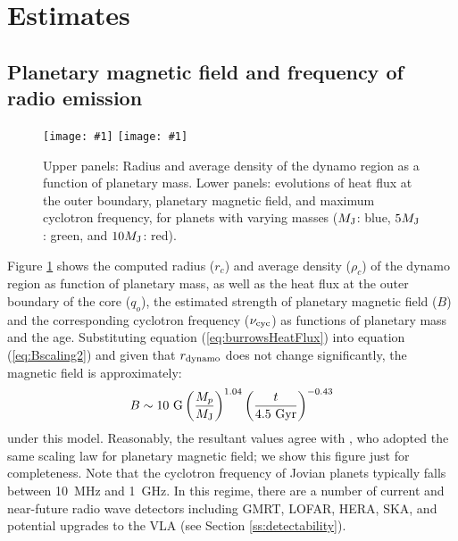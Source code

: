 \documentclass[iop,numberedappendix,apj,twocolappendix,]{emulateapj}
\def\plotoneh#1{\centering \leavevmode
\texttt{[image: \#1]}}
\begin{document}
\section{Estimates}
\label{s:result}

\subsection{Planetary magnetic field and frequency of radio emission}
\label{ss:Bplanet}


\begin{figure}[bhtp]
   \plotoneh{rho_r_dynamo.pdf}
   \plotoneh{qBf_Christensen.pdf}
   \caption{Upper panels: Radius and average density of the dynamo region as a function of planetary mass. Lower panels: evolutions of heat flux at the outer boundary, planetary magnetic field, and maximum cyclotron frequency, for planets with varying masses ($M_{\rm J}$: blue, $5M_{\rm J}$: green, and $10M_{\rm J}$: red). } 
  \label{fig:planetaryB}
\end{figure}

Figure \ref{fig:planetaryB} shows the computed radius ($r_c$) and average density ($\rho_c$) of the dynamo region as function of planetary mass, as well as the heat flux at the outer boundary of the core ($q_o$), the estimated strength of planetary magnetic field ($B$) and the corresponding cyclotron frequency ($\nu_{\rm cyc}$) as functions of planetary mass and the age. 
Substituting equation (\ref{eq:burrowsHeatFlux}) into equation (\ref{eq:Bscaling2}) and given that $r_{\rm dynamo} $ does not change significantly, the magnetic field is approximately:
\begin{equation}
B   \sim   10~{\rm G} \left( \frac{M_p }{M_{\rm J}} \right)^{1.04} \left( \frac{t}{4.5~\rm{Gyr}} \right)^{-0.43} \label{eq:scalingB}
\end{equation}
under this model. 
Reasonably, the resultant values agree with \citet{reiners2010}, who adopted the same scaling law for planetary magnetic field; we show this figure just for completeness. 
Note that the cyclotron frequency of Jovian planets typically falls between 10~MHz and 1~GHz. 
In this regime, there are a number of current and near-future radio wave detectors including GMRT, 
LOFAR, HERA, SKA, and potential upgrades to the VLA (see Section \ref{ss:detectability}). 
\end{document}
